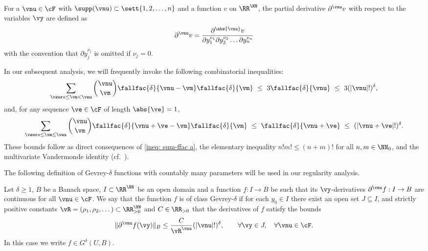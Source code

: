 For a $\vnu\in \cF$ with  $\supp (\vnu) \subset\sett{1,2,\dots, n}$ and a function $v$ on $\RR^\NN$, the partial derivative $\partial^{\vnu} v$ with respect to the variables $\vy$ are defined as
\begin{align*}
	\partial^{\vnu} v
	=
	\frac{\partial^{\abs{\vnu}}v}
	{\partial y_1^{\nu_1} \partial y_2^{\nu_2} \dots \partial y_n^{\nu_n}}
\end{align*}
with the convention that $\partial y_j^{\nu_j}$ is omitted if $\nu_j =0$. 

In our subsequent analysis, we will frequently invoke the following combinatorial inequalities:
\begin{equation} \label{frac{1}{4}...}	
	\sum_{{\vzero \le \vm < \vnu}} \binom{\vnu}{\vm}\fallfac{\delta}{{\vnu-\vm}}\fallfac{\delta}{{\vm}}
	\  \le \
	3\fallfac{\delta}{{\vnu}}
	\ \le \ 	
	3(|\vnu|!)^\delta,		
\end{equation}	
and, for any sequence $\ve \in \cF$ of length $\abs{\ve}=1$,
\begin{equation} \label{fall_fac_ineq}	
	\sum_{{\vzero \leq}\vm \le \vnu} \binom{\vnu}{\vm}\fallfac{\delta}{{\vnu+\ve-\vm}}\fallfac{\delta}{{\vm}}
	\  \le \
	\fallfac{\delta}{{\vnu+\ve}}
	\ \le \ 	
	(|\vnu+\ve|!)^\delta.		
\end{equation}	
These bounds follow as direct consequences of \eqref{ineq: sum-ffac a}, the elementary inequality $n!m!\leq (n+m)!$ for all $n,m\in \NN_0$, and the multivariate Vandermonde identity (cf.\ \cite[Lemma 7.1]{CL2024}).

 The following definition of Gevrey-$\delta$ functions with countably many parameters will be used in our regularity analysis.
\begin{definition} \label{def:G-delta-def}
	Let $\delta \geq 1$, $B$ be a Banach space, $I \subset \RR^\NN$ be an open domain and a function $f:I \to B$ be such that its $\vy$-derivatives $\partial^{\vnu} f:I \to B$ are continuous for all $\vnu \in \cF$. We say that the function $f$ is of class Gevrey-$\delta$ if for each $y_0 \in I$ there exist an open set $J\subseteq I$, and strictly positive constants $\vR = (\rho_1,\rho_2,\dots) \subset \RR_{>0}^{\NN}$ and $C \in \RR_{>0}$ that the derivatives of $f$ satisfy the bounds
	\begin{equation}\label{G-delta-def}
		\|\partial^{\vnu} f(\vy)\|_B \leq \frac{C}{\vR^{\vnu}} (|\vnu|!)^\delta, \qquad \forall \vy \in J, \quad \forall \vnu \in \cF.
	\end{equation}
	In this case we write $f \in G^\delta(U,B)$.
\end{definition}


